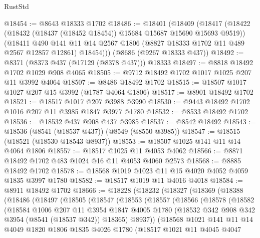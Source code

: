 \begin{lexlean}{RustStd}
\begin{coremodule}
@18454 := @8643 @18333 @1702
@18486 := @18401
    (@18409
      (@18417
        (@18422 (@18432 (@18437 (@18452 @18454)) @15684 @15687 @15690 @15693 @9519))
        (@18411
          @490
          @141
          @11
          @14
          @2567
          @1806
          (@8827 @18333 @1702 @11 @489 @2567 @12857 @12861)
          @18454)))
    (@8686 (@9267 @18333 @437))
@18492 := @8371 (@8373 @437 (@17129 (@8378 @437))) @18333
@18497 := @8818 @18492 @1702 @1029 @908 @4065
@18505 := @9712 @18492 @1702 @1017 @1025 @207 @11 @3992 @4064
@18507 := @8486 @18492 @1702
@18515 := @18507 @1017 @1027 @207 @15 @3992 (@1787 @4064 @1806)
@18517 := @8901 @18492 @1702
@18521 := @18517 @1017 @207 @3988 @3990
@18530 := @9443 @18492 @1702 @1016 @207 @11 @3985 @1847 @3977 @1780
@18532 := @8533 @18492 @1702
@18536 := @18532 @437 @908 @437 @3985
@18537 := @8542 @18492
@18543 := @18536 (@8541 (@18537 @437)) (@8549 (@8550 @3985))
@18547 := @18515 (@18521 (@18530 @18543 @8937))
@18553 := @18507 @1025 @141 @11 @14 @4064 @1806
@18557 := @18517 @1025 @11 @4053 @4062
@18566 := @8871 @18492 @1702 @483 @1024 @16 @11 @4053 @4060 @2573
@18568 := @8885 @18492 @1702
@18578 := @18568 @1019 @1023 @11 @15 @4020 @4052 @4059 @1835 @3997 @1780
@18582 := @18517 @1019 @11 @4016 @4018
@18584 := @8911 @18492 @1702
@18666 := @18228
    (@18232
      (@18327
        (@18369
          (@18388
            (@18486
              (@18497
                (@18505
                  (@18547
                    (@18553
                      (@18557
                        (@18566
                          (@18578
                            (@18582
                              (@18584
                                @1006
                                @207
                                @11
                                @3954
                                @1847
                                @4005
                                @1780
                                (@18532 @342 @908 @342 @3954 (@8541 (@18537 @342)) @18365)
                                @8937))
                            (@18568
                              @1021
                              @141
                              @11
                              @14
                              @4049
                              @1820
                              @1806
                              @1835
                              @4026
                              @1780
                              (@18517
                                @1021
                                @11
                                @4045
                                @4047

\end{coremodule}
\end{lexlean}

